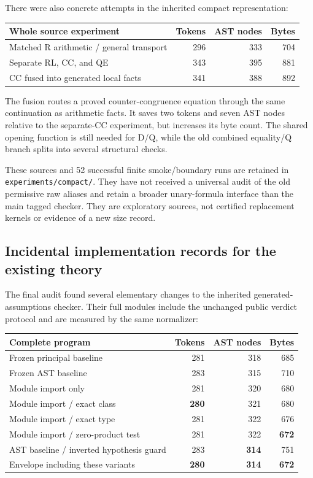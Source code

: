 \documentclass[11pt,letterpaper]{article}
\theoremstyle{definition}\newtheorem{definition}[theorem]{Definition}
\theoremstyle{remark}\newtheorem{remark}[theorem]{Remark}
\newcommand{\file}[1]{{\small\nolinkurl{#1}}}
\begin{document}
There were also concrete attempts in the inherited compact representation:
\begin{center}\small
\begin{tabular}{lrrr}
\toprule
Whole source experiment & Tokens & AST nodes & Bytes\\
\midrule
Matched R arithmetic / general transport &296&333&704\\
Separate RL, CC, and QE &343&395&881\\
CC fused into generated local facts &341&388&892\\
\bottomrule
\end{tabular}
\end{center}
The fusion routes a proved counter-congruence equation through the same
continuation as arithmetic facts. It saves two tokens and seven AST nodes
relative to the separate-CC experiment, but increases its byte count.
The shared opening function is still needed for D/Q, while the old combined
equality/Q branch splits into several structural checks.

These sources and 52 successful finite smoke/boundary runs are retained
in \file{experiments/compact/}. They have not received a universal audit
of the old permissive raw aliases and retain a broader unary-formula
interface than the main tagged checker. They are exploratory sources,
not certified replacement kernels or evidence of a new size record.

\subsection{Incidental implementation records for the existing theory}
\label{sec:incidental}

The final audit found several elementary changes to the inherited
generated-assumptions checker. Their full modules include the unchanged
public verdict protocol and are measured by the same normalizer:
\begin{center}\small
\begin{tabular}{lrrr}
\toprule
Complete program & Tokens & AST nodes & Bytes\\
\midrule
Frozen principal baseline &281&318&685\\
Frozen AST baseline &283&315&710\\
Module import only &281&320&680\\
Module import / exact class &\textbf{280}&321&680\\
Module import / exact type &281&322&676\\
Module import / zero-product test &281&322&\textbf{672}\\
AST baseline / inverted hypothesis guard &283&\textbf{314}&751\\
\midrule
Envelope including these variants &\textbf{280}&\textbf{314}&\textbf{672}\\
\bottomrule
\end{tabular}
\end{center}
\end{document}
